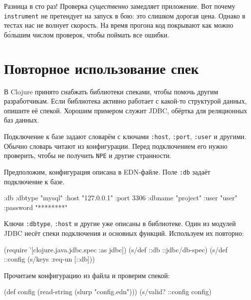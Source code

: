 Разница в сто раз! Проверка \emph{существенно} замедляет приложение. Вот почему
\verb|instrument| не претендует на запуск в бою: это слишком дорогая
цена. Однако в тестах нас не волнует скорость. На время прогона код покрывают
как можно б\'{о}льшим числом проверок, чтобы поймать все ошибки.

\section{Повторное использование спек}


В Clojure принято снабжать библиотеки спеками, чтобы помочь другим
разработчикам. Если библиотека активно работает с какой-то структурой данных,
опишите её спекой. Хорошим примером служит
JDBC, обёртка для реляционных
баз данных.

Подключение к базе задают словарём с ключами \verb|:host|, \verb|:port|,
\verb|:user| и другими. Обычно словарь читают из конфигурации. Перед
подключением его нужно проверить, чтобы не получить \verb|NPE| и другие
странности.


Предположим, конфигурация описана в EDN-файле. Поле \verb|:db| задаёт
подключение к базе.


\begin{english}
  \begin{clojure}
{:db {:dbtype "mysql"
      :host "127.0.0.1"
      :port 3306
      :dbname "project"
      :user "user"
      :password "********"}}
  \end{clojure}
\end{english}

Ключи \verb|:dbtype|, \verb|:host| и другие уже описаны в библиотеке. Один
из модулей JDBC несёт спеки подключения и основных функций. Используем их
повторно:

\begin{english}
  \begin{clojure}
(require '[clojure.java.jdbc.spec :as jdbc])
(s/def ::db ::jdbc/db-spec)
(s/def ::config (s/keys :req-un [::db]))
  \end{clojure}
\end{english}

\noindent
Прочитаем конфигурацию из файла и проверим спекой:

\begin{english}
  \begin{clojure}
(def config (read-string (slurp "config.edn")))
(s/valid? ::config config)
  \end{clojure}
\end{english}

